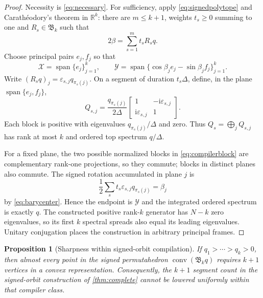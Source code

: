 \documentclass[11pt]{article}
\newtheorem{proposition}[theorem]{Proposition}
\theoremstyle{definition}
\theoremstyle{remark}
\begin{document}
\begin{proof}
Necessity is \eqref{eq:necessary}.  For sufficiency, apply
\eqref{eq:signedpolytope} and Carath\'eodory's theorem in $\mathbb R^k$:
there are $m\leq k+1$, weights $t_s\geq0$ summing to one and
$R_s\in\mathfrak B_k$ such that
\begin{equation}\label{eq:barycenter}
 2\beta=\sum_{s=1}^m t_sR_sq.
\end{equation}
Choose principal pairs $e_j,f_j$ so that
\[
 \mathcal X=\operatorname{span}\{e_j\}_{j=1}^k,
 \qquad
 \mathcal Y=\operatorname{span}\{\cos\beta_j e_j-\sin\beta_j f_j\}_{j=1}^k.
\]
Write $(R_sq)_j=\varepsilon_{s,j}q_{\pi_s(j)}$.
On a segment of duration $t_s\Delta$, define, in the plane
$\operatorname{span}\{e_j,f_j\}$,
\begin{equation}\label{eq:compilerblock}
 Q_{s,j}=\frac{q_{\pi_s(j)}}{2\Delta}
 \begin{bmatrix}1&-\mathrm i\varepsilon_{s,j}\\
 \mathrm i\varepsilon_{s,j}&1\end{bmatrix}.
\end{equation}
Each block is positive with eigenvalues $q_{\pi_s(j)}/\Delta$ and zero.
Thus $Q_s=\bigoplus_jQ_{s,j}$ has rank at most $k$ and ordered top spectrum
$q/\Delta$.

For a fixed plane, the two possible normalized blocks in
\eqref{eq:compilerblock} are complementary rank-one projections, so they
commute; blocks in distinct planes also commute.  The signed rotation
accumulated in plane $j$ is
\[
 \frac12\sum_s t_s\varepsilon_{s,j}q_{\pi_s(j)}=\beta_j
\]
by \eqref{eq:barycenter}.  Hence the endpoint is $\mathcal Y$ and the
integrated ordered spectrum is exactly $q$.  The constructed positive
rank-$k$ generator has $N-k$ zero eigenvalues, so its first $k$ spectral
spreads also equal its leading eigenvalues.  Unitary conjugation places the
construction in arbitrary principal frames.
\end{proof}

\begin{proposition}[Sharpness within signed-orbit compilation]\label{prop:segments}
If $q_1>\cdots>q_k>0$, then almost every point in the signed permutahedron
$\operatorname{conv}(\mathfrak B_kq)$ requires $k+1$ vertices in a convex
representation.  Consequently, the $k+1$ segment count in the signed-orbit
construction of \cref{thm:complete} cannot be lowered uniformly within that
compiler class.
\end{proposition}
\end{document}
